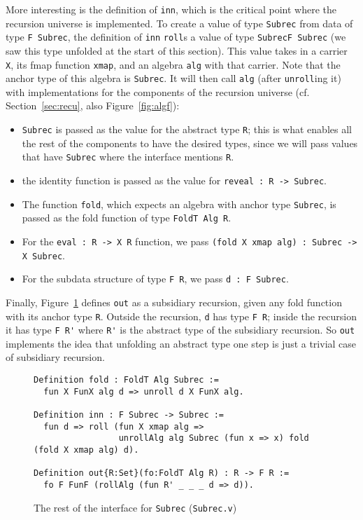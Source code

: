 \documentclass[a4paper,USenglish]{lipics-v2021}
\begin{document}
More interesting is the definition of \verb|inn|, which is the
critical point where the recursion universe is implemented.  To create
a value of type \verb|Subrec| from data of type \verb|F Subrec|, the
definition of \verb|inn| \verb|roll|s a value of type
\verb|SubrecF Subrec| (we saw this type unfolded at the start of
this section).  This value takes in a carrier
\verb|X|, its fmap function \verb|xmap|, and an algebra \verb|alg|
with that carrier.  Note that the anchor type of this algebra is
\verb|Subrec|.  It will then call \verb|alg| (after \verb|unroll|ing
it) with implementations for the components of the recursion universe
(cf. Section~\ref{sec:recu}, also Figure~\ref{fig:algf}):
\begin{itemize}
\item \verb|Subrec| is passed as the value for the abstract type \verb|R|; this is what enables all
  the rest of the components to have the desired types, since we will pass values that have \verb|Subrec|
  where the interface mentions \verb|R|.
\item the identity function is passed as the value for \verb|reveal : R -> Subrec|.
\item The function \verb|fold|, which expects an algebra with anchor type \verb|Subrec|, is passed as
  the fold function of type \verb|FoldT Alg R|. 
\item For the \verb|eval : R -> X R| function, we pass \verb|(fold X xmap alg) : Subrec -> X Subrec|.
\item For the subdata structure of type \verb|F R|, we pass \verb|d : F Subrec|. 
\end{itemize}

Finally, Figure~\ref{fig:subrecb} defines \verb|out| as a subsidiary
recursion, given any fold function with its anchor type \verb|R|.
Outside the recursion, \verb|d| has type \verb|F R|; inside the
recursion it has type \verb|F R'| where \verb|R'| is the abstract type
of the subsidiary recursion.  So \verb|out| implements the idea that
unfolding an abstract type one step is just a trivial case of
subsidiary recursion.

\begin{figure}
\begin{verbatim}
Definition fold : FoldT Alg Subrec := 
  fun X FunX alg d => unroll d X FunX alg.

Definition inn : F Subrec -> Subrec :=
  fun d => roll (fun X xmap alg =>
                 unrollAlg alg Subrec (fun x => x) fold (fold X xmap alg) d).

Definition out{R:Set}(fo:FoldT Alg R) : R -> F R :=
  fo F FunF (rollAlg (fun R' _ _ _ d => d)).
\end{verbatim}
\caption{The rest of the interface for \texttt{Subrec} (\texttt{Subrec.v})}
\label{fig:subrecb}
\end{figure}
\end{document}
